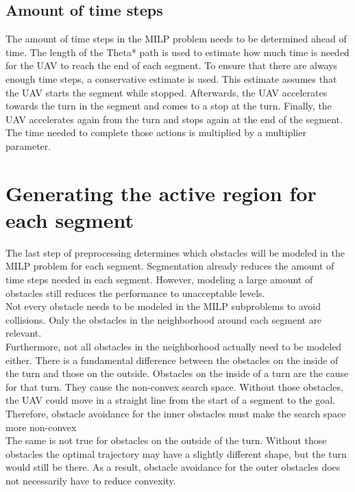 %

\subsection{Amount of time steps}
The amount of time steps in the MILP problem needs to be determined ahead of time. The length of the Theta* path is used to estimate how much time is needed for the UAV to reach the end of each segment. To ensure that there are always enough time steps, a conservative estimate is used. This estimate assumes that the UAV starts the segment while stopped. Afterwards, the UAV accelerates towards the turn in the segment and comes to a stop at the turn. Finally, the UAV accelerates again from the turn and stops again at the end of the segment. The time needed to complete those actions is multiplied by a multiplier parameter.



\section{Generating the active region for each segment}
The last step of preprocessing determines which obstacles will be modeled in the MILP problem for each segment. Segmentation already reduces the amount of time steps needed in each segment. However, modeling a large amount of obstacles still reduces the performance to unacceptable levels. \\
Not every obstacle needs to be modeled in the MILP subproblems to avoid collisions. Only the obstacles in the neighborhood around each segment are relevant. \\
Furthermore, not all obstacles in the neighborhood actually need to be modeled either. There is a fundamental difference between the obstacles on the inside of the turn and those on the outside. Obstacles on the inside of a turn are the cause for that turn. They cause the non-convex search space. Without those obstacles, the UAV could move in a straight line from the start of a segment to the goal. Therefore, obstacle avoidance for the inner obstacles must make the search space more non-convex\\
The same is not true for obstacles on the outside of the turn. Without those obstacles the optimal trajectory may have a slightly different shape, but the turn would still be there. As a result, obstacle avoidance for the outer obstacles does not necessarily have to reduce convexity. \\

